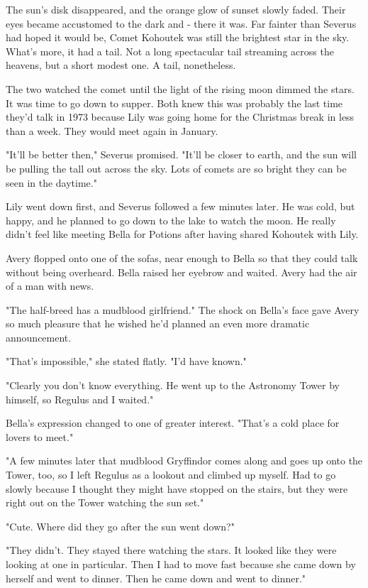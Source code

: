 \documentclass[a4paper,11pt]{article}
\begin{document}
The sun's disk disappeared, and the orange glow of sunset slowly faded. Their eyes became accustomed to the dark and - there it was. Far fainter than Severus had hoped it would be, Comet Kohoutek was still the brightest star in the sky. What's more, it had a tail. Not a long spectacular tail streaming across the heavens, but a short modest one. A tail, nonetheless.

The two watched the comet until the light of the rising moon dimmed the stars. It was time to go down to supper. Both knew this was probably the last time they'd talk in 1973 because Lily was going home for the Christmas break in less than a week. They would meet again in January.

"It'll be better then," Severus promised. "It'll be closer to earth, and the sun will be pulling the tall out across the sky. Lots of comets are so bright they can be seen in the daytime."

Lily went down first, and Severus followed a few minutes later. He was cold, but happy, and he planned to go down to the lake to watch the moon. He really didn't feel like meeting Bella for Potions after having shared Kohoutek with Lily.

Avery flopped onto one of the sofas, near enough to Bella so that they could talk without being overheard. Bella raised her eyebrow and waited. Avery had the air of a man with news.

"The half-breed has a mudblood girlfriend." The shock on Bella's face gave Avery so much pleasure that he wished he'd planned an even more dramatic announcement.

"That's impossible," she stated flatly. "I'd have known."

"Clearly you don't know everything. He went up to the Astronomy Tower by himself, so Regulus and I waited."

Bella's expression changed to one of greater interest. "That's a cold place for lovers to meet."

"A few minutes later that mudblood Gryffindor comes along and goes up onto the Tower, too, so I left Regulus as a lookout and climbed up myself. Had to go slowly because I thought they might have stopped on the stairs, but they were right out on the Tower watching the sun set."

"Cute. Where did they go after the sun went down?"

"They didn't. They stayed there watching the stars. It looked like they were looking at one in particular. Then I had to move fast because she came down by herself and went to dinner. Then he came down and went to dinner."
\end{document}
